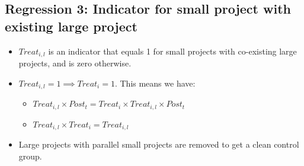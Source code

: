 \documentclass[
]{article}
\providecommand{\tightlist}{%
  \setlength{\itemsep}{0pt}\setlength{\parskip}{0pt}}
\begin{document}
\hypertarget{regression-3-indicator-for-small-project-with-existing-large-project}{%
\subsection{Regression 3: Indicator for small project with existing
large
project}\label{regression-3-indicator-for-small-project-with-existing-large-project}}

\begin{itemize}
\tightlist
\item
  \(Treat_{i,l}\) is an indicator that equals 1 for small projects with
  co-existing large projects, and is zero otherwise.
\item
  \(Treat_{i,l}=1 \implies Treat_i = 1\). This means we have:

  \begin{itemize}
  \tightlist
  \item
    \(Treat_{i,l} \times Post_t = Treat_i \times Treat_{i,l} \times Post_t\)
  \item
    \(Treat_{i,l} \times Treat_i = Treat_{i,l}\)
  \end{itemize}
\item
  Large projects with parallel small projects are removed to get a clean
  control group.
\end{itemize}
\end{document}
